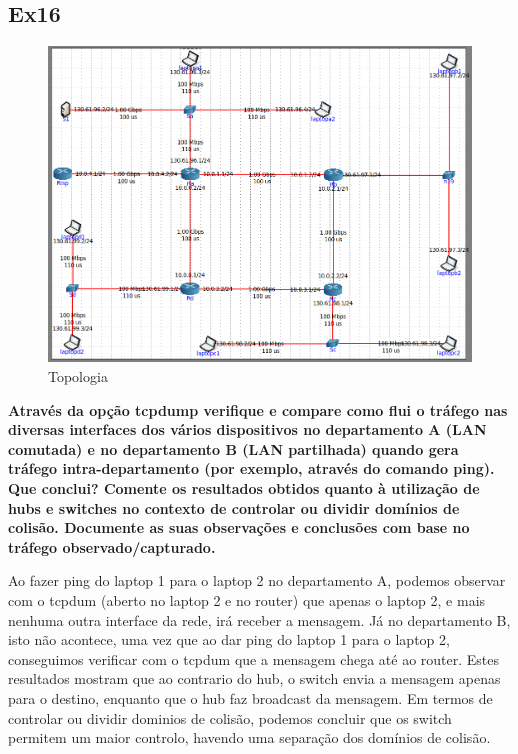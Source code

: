 \documentclass{article}
\begin{document}
\subsection{Ex16}
\begin{figure}[h]
	\centering
	\includegraphics[scale = 0.3]{rede-ex16.PNG}
	\caption{Topologia}
\end{figure}

\textbf{Através da opção tcpdump verifique e compare como flui o tráfego nas diversas interfaces dos vários dispositivos no departamento A (LAN comutada) e no departamento B (LAN partilhada) quando gera tráfego intra-departamento (por exemplo, através do comando ping). Que conclui? Comente os resultados obtidos quanto à utilização de hubs e switches no contexto de controlar ou dividir domínios de colisão. Documente as suas observações e conclusões com base no tráfego observado/capturado.}\\\par
Ao fazer ping do laptop 1 para o laptop 2 no departamento A, podemos observar com o tcpdum (aberto no laptop 2 e no router) que apenas o laptop 2, e mais nenhuma outra interface da rede, irá receber a mensagem. Já no departamento B, isto não acontece, uma vez que ao dar ping do laptop 1 para o laptop 2, conseguimos verificar com o tcpdum que a mensagem chega até ao router. Estes resultados mostram que ao contrario do hub, o switch envia a mensagem apenas para o destino, enquanto que o hub faz broadcast da mensagem. Em termos de controlar ou dividir dominios de colisão, podemos concluir que os switch permitem um maior controlo, havendo uma separação dos domínios de colisão.
\end{document}
